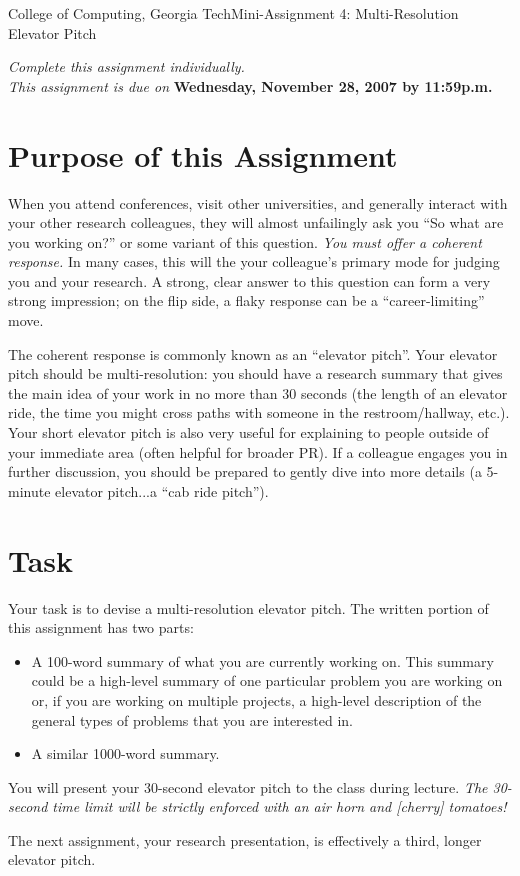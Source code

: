 \documentclass[11pt]{article}
\begin{document}


{College of Computing, Georgia Tech}{Mini-Assignment 4: Multi-Resolution
Elevator Pitch}

{\em Complete this assignment individually. \\  This
  assignment is due on} {\bf Wednesday, November 28, 2007 by 11:59p.m.}

\section{Purpose of this Assignment}


When you attend conferences, visit other universities, and generally
interact with your other research colleagues, they will almost
unfailingly ask you ``So what are you working on?'' or some variant of
this question.  {\em You must offer a coherent response.}  In many
cases, this will the your colleague's primary mode for judging you and
your research.  A strong, clear answer to this question can form a very
strong impression; on the flip side, a flaky response can be a
``career-limiting'' move.

The coherent response is commonly known as an ``elevator pitch''.  Your
elevator pitch should be multi-resolution: you should have a research
summary that gives the main idea of your work in no more than 30 seconds
(the length of an elevator ride, the time you might cross paths with
someone in the restroom/hallway, etc.).  Your short elevator pitch is
also very useful for explaining to people outside of your immediate area
(often helpful for broader PR).  If a colleague engages you in further
discussion, you should be prepared to gently dive into more details (a
5-minute elevator pitch...a ``cab ride pitch'').

\section{Task}


Your task is to devise a multi-resolution elevator pitch.  The written
portion of this assignment has two parts:
\begin{itemize}
\item A 100-word summary of what you are currently working on.  This
  summary could be a high-level summary of one particular problem you
  are working on or, if you are working on multiple projects, a
  high-level description of the general types of problems that you are
  interested in.
\item A similar 1000-word summary.
\end{itemize}
\noindent
You will present your 30-second elevator pitch to the class during
lecture.  {\em The 30-second time limit will be strictly enforced with
an air horn and [cherry] tomatoes!}

The next assignment, your research presentation, is effectively a third,
longer elevator pitch.
\end{document}
